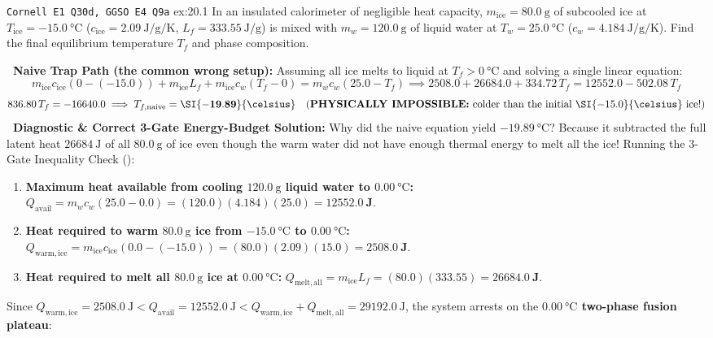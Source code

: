 \begin{workedexample}{\texttt{Cornell E1 Q30d, GGSO E4 Q9a} }{ex:20.1}
In an insulated calorimeter of negligible heat capacity, $m_{\mathrm{ice}} = \SI{80.0}{\gram}$ of subcooled ice at $T_{\mathrm{ice}} = \SI{-15.0}{\celsius}$ ($c_{\mathrm{ice}} = \SI{2.09}{\joule\per\gram\per\kelvin}$, $L_f = \SI{333.55}{\joule\per\gram}$) is mixed with $m_w = \SI{120.0}{\gram}$ of liquid water at $T_w = \SI{25.0}{\celsius}$ ($c_w = \SI{4.184}{\joule\per\gram\per\kelvin}$). Find the final equilibrium temperature $T_f$ and phase composition.
\par\smallskip\noindent
\textbf{\xmark\ Naive Trap Path (the common wrong setup):} Assuming all ice melts to liquid at $T_f > \SI{0}{\celsius}$ and solving a single linear equation:
$$m_{\mathrm{ice}}c_{\mathrm{ice}}(0 - (-15.0)) + m_{\mathrm{ice}}L_f + m_{\mathrm{ice}}c_w(T_f - 0) = m_w c_w(25.0 - T_f) \implies 2508.0 + 26684.0 + 334.72\,T_f = 12552.0 - 502.08\,T_f$$
$$836.80\,T_f = -16640.0 \implies T_{f,\mathrm{naive}} = \mathbf{\SI{-19.89}{\celsius}} \quad (\text{\textbf{PHYSICALLY IMPOSSIBLE:} colder than the initial }\SI{-15.0}{\celsius}\text{ ice!})$$
\textbf{\cmark\ Diagnostic \& Correct 3-Gate Energy-Budget Solution:}
Why did the naive equation yield $\SI{-19.89}{\celsius}$? Because it subtracted the full latent heat $\SI{26684}{\joule}$ of all $\SI{80.0}{\gram}$ of ice even though the warm water did not have enough thermal energy to melt all the ice! Running the 3-Gate Inequality Check ():
\begin{enumerate}
  \item \textbf{Maximum heat available from cooling $\SI{120.0}{\gram}$ liquid water to $\SI{0.00}{\celsius}$:} $Q_{\mathrm{avail}} = m_w c_w(25.0 - 0.0) = (120.0)(4.184)(25.0) = \mathbf{\SI{12552.0}{\joule}}$.
  \item \textbf{Heat required to warm $\SI{80.0}{\gram}$ ice from $\SI{-15.0}{\celsius}$ to $\SI{0.00}{\celsius}$:} $Q_{\mathrm{warm,ice}} = m_{\mathrm{ice}}c_{\mathrm{ice}}(0.0 - (-15.0)) = (80.0)(2.09)(15.0) = \mathbf{\SI{2508.0}{\joule}}$.
  \item \textbf{Heat required to melt all $\SI{80.0}{\gram}$ ice at $\SI{0.00}{\celsius}$:} $Q_{\mathrm{melt,all}} = m_{\mathrm{ice}}L_f = (80.0)(333.55) = \mathbf{\SI{26684.0}{\joule}}$.
\end{enumerate}
Since $Q_{\mathrm{warm,ice}} = \SI{2508.0}{\joule} < Q_{\mathrm{avail}} = \SI{12552.0}{\joule} < Q_{\mathrm{warm,ice}} + Q_{\mathrm{melt,all}} = \SI{29192.0}{\joule}$, the system arrests on the \textbf{$\SI{0.00}{\celsius}$ two-phase fusion plateau}:

\end{workedexample}

